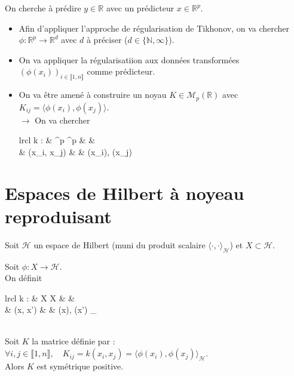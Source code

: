 \documentclass[12pt,a4paper]{article}
\newcommand{\propriete}[2]{%
    \begin{tcolorbox}[colback=white,colframe=green!25!white,title=\textbf{Propriété #1}, coltitle=black]
        #2
    \end{tcolorbox}
}
\newcommand{\important}[1]{%
    \begin{tcolorbox}[colback=red!10!white,colframe=red!30!black]
        #1
    \end{tcolorbox}
}
\begin{document}
\important{
    On cherche à prédire $y \in {}$ avec un prédicteur $x \in \mathbb{R}^p$.
    \begin{itemize}
        \item Afin d'appliquer l'approche de régularisation de Tikhonov, on va chercher $\phi : \mathbb{R}^p \longrightarrow \mathbb{R}^d$ avec $d$ à préciser ($d \in \{\mathbb{N}, \infty\}$).
        
        \item On va appliquer la régularisatiion aux données transformées $(\phi(x_i))_{i \in \llbracket 1, n \rrbracket}$ comme prédicteur.
        
        \item On va être amené à construire un noyau $K \in \mathcal{M}_p(\mathbb{R})$ avec $K_{ij} = \langle \phi(x_i), \phi(x_j) \rangle$. \\
        $\rightarrow$ On va chercher \begin{array}[t]{lrcl}
            k : & \mathbb{R}^p \times \mathbb{R}^p & \longrightarrow & \mathbb{R} \\
                & (x_i, x_j) & \longmapsto & \langle \phi(x_i), \phi(x_j) \rangle
        \end{array}

    \end{itemize}
}




\section{Espaces de Hilbert à noyeau reproduisant}

Soit $\mathcal{H}$ un espace de Hilbert (muni du produit scalaire $\langle \cdot, \cdot \rangle_{\mathcal{H}}$) et $X \subset {}$. \\


\propriete{}{
    Soit $\phi : X \longrightarrow \mathcal{H}$. \\
    On définit \begin{array}[t]{lrcl}
        k : & X \times X & \longrightarrow & \mathbb{R} \\
            & (x, x') & \longmapsto & \langle \phi(x), \phi(x') \rangle_{\mathcal{H}}
    \end{array} \\

    Soit $K$ la matrice définie par :\\
    $\forall i, j \in \llbracket 1, n \rrbracket, \quad K_{ij} = k(x_i, x_j) = \langle \phi(x_i), \phi(x_j) \rangle_{\mathcal{H}}$. \\

    Alors $K$ est symétrique positive.    
}
\end{document}
